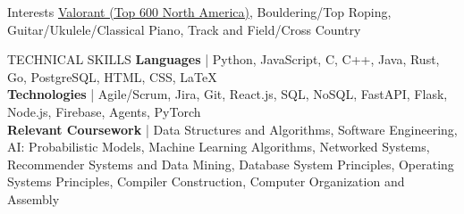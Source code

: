 \documentclass{resume}
\begin{document}

    
    
\begin{rSection}{Interests}
    \href{https://tracker.gg/valorant/profile/riot/hpwiggler%23hajin/overview} {Valorant (Top 600 North America)}, Bouldering/Top Roping, Guitar/Ukulele/Classical Piano, Track and Field/Cross Country
    
\end{rSection}
\begin{rSection}{TECHNICAL SKILLS}
{\bf Languages} | Python, JavaScript, C, C++, Java, Rust, Go, PostgreSQL, HTML, CSS, LaTeX \\
{\bf Technologies} | Agile/Scrum, Jira, Git, React.js, SQL, NoSQL, FastAPI, Flask, Node.js, Firebase, Agents, PyTorch \\
{\bf Relevant Coursework} | Data Structures and Algorithms, Software Engineering, AI: Probabilistic Models, Machine Learning Algorithms, Networked Systems, Recommender Systems and Data Mining, Database System Principles,  Operating Systems Principles, Compiler Construction, Computer Organization and Assembly
\end{rSection}  
\end{document}
